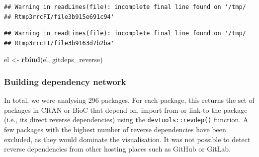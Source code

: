 \documentclass[]{article}
\newenvironment{Shaded}{\begin{snugshade}}{\end{snugshade}}
\newcommand{\DataTypeTok}[1]{\textcolor[rgb]{0.13,0.29,0.53}{#1}}
\newcommand{\KeywordTok}[1]{\textcolor[rgb]{0.13,0.29,0.53}{\textbf{#1}}}
\newcommand{\NormalTok}[1]{#1}
\newcommand{\OperatorTok}[1]{\textcolor[rgb]{0.81,0.36,0.00}{\textbf{#1}}}
\newcommand{\StringTok}[1]{\textcolor[rgb]{0.31,0.60,0.02}{#1}}
\begin{document}
\begin{Shaded}
\end{Shaded}

\begin{verbatim}
## Warning in readLines(file): incomplete final line found on '/tmp/
## Rtmp3rrcFI/file3b915e691c94'
\end{verbatim}

\begin{verbatim}
## Warning in readLines(file): incomplete final line found on '/tmp/
## Rtmp3rrcFI/file3b9163d7b2ba'
\end{verbatim}

\begin{Shaded}
\begin{Highlighting}[]
\NormalTok{el <-}\StringTok{ }\KeywordTok{rbind}\NormalTok{(el, gitdeps_reverse)}
\end{Highlighting}
\end{Shaded}

\hypertarget{building-dependency-network}{%
\subsubsection*{Building dependency network}\label{building-dependency-network}}

In total, we were analysing 296 packages.
For each package, this returns the set of packages in CRAN or BioC that depend on, import from or link to the package (i.e., its direct reverse dependencies) using the \texttt{devtools::revdep()} function. A few packages with the highest number of reverse dependencies have been excluded, as they would dominate the visualisation.
It was not possible to detect reverse dependencies from other hosting places such as GitHub or GitLab.
\end{document}
